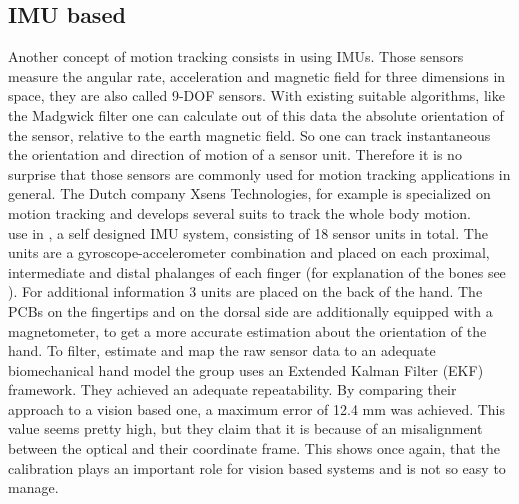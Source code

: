 \subsection{IMU based} \label{subsec:approaches:IMU}
Another concept of motion tracking consists in using IMUs. Those sensors measure the angular rate, acceleration and magnetic field for three dimensions in space, they are also called 9-DOF sensors. With existing suitable algorithms, like the Madgwick filter \cite{madgwick2010efficient} one can calculate out of this data the absolute orientation of the sensor, relative to the earth magnetic field. So one can track instantaneous the orientation and direction of motion of a sensor unit. Therefore it is no surprise that those sensors are commonly used for motion tracking applications in general. The Dutch company Xsens Technologies, for example is specialized on motion tracking and develops several suits to track the whole body motion.\\
\cite{kortier2012ambulatory} use in \cite{kortier2012ambulatory}, \cite{kortier2014assessment} a self designed IMU system, consisting of 18 sensor units in total. The units are a gyroscope-accelerometer combination and placed on each proximal, intermediate and distal phalanges of each finger (for explanation of the bones see ). For additional information 3 units are placed on the back of the hand. The PCBs on the fingertips and on the dorsal side are additionally equipped with a magnetometer, to get a more accurate estimation about the orientation of the hand. To filter, estimate and map the raw sensor data to an adequate biomechanical hand model the group uses an Extended Kalman Filter (EKF) framework. They achieved an adequate repeatability. By comparing their approach to a vision based one, a maximum error of 12.4 mm was achieved. This value seems pretty high, but they claim that it is because of an misalignment between the optical and their coordinate frame. This shows once again, that the calibration plays an important role for vision based systems and is not so easy to manage.\\
